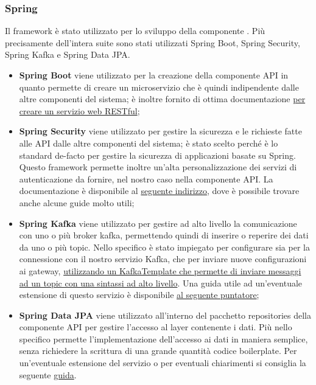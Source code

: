 		\subsubsection{Spring}
			Il framework  è stato utilizzato per lo sviluppo della componente . Più precisamente dell'intera suite sono stati utilizzati Spring Boot, Spring Security, Spring Kafka e Spring Data JPA.
			\newline
			\begin{itemize}
				\item \textbf{Spring Boot} viene utilizzato per la creazione della componente API in quanto permette di creare un microservizio che è quindi indipendente dalle altre componenti del sistema; è inoltre fornito di ottima documentazione \href{https://spring.io/guides/gs/rest-service/}{per creare un servizio web RESTful};
				\item \textbf{Spring Security} viene utilizzato per gestire la sicurezza e le richieste fatte alle API dalle altre componenti del sistema; è stato scelto perché è lo standard de-facto per gestire la sicurezza di applicazioni basate su Spring.
				Questo framework permette inoltre un'alta personalizzazione dei servizi di autenticazione da fornire, nel nostro caso nella componente API. La documentazione è disponibile al \href{https://spring.io/projects/spring-security#learn}{seguente indirizzo}, dove è possibile trovare anche alcune guide molto utili;
				\item \textbf{Spring Kafka} viene utilizzato per gestire ad alto livello la comunicazione con uno o più broker kafka, permettendo quindi di inserire o reperire dei dati da uno o più topic.
				Nello specifico è stato impiegato per configurare sia per la connessione con il nostro servizio Kafka, che per inviare nuove configurazioni ai gateway, \href{https://docs.spring.io/spring-kafka/docs/2.4.6.RELEASE/reference/html/#kafka-template}{utilizzando un KafkaTemplate che permette di inviare messaggi ad un topic con una sintassi ad alto livello}.
				Una guida utile ad un'eventuale estensione di questo servizio è disponibile \href{https://docs.spring.io/spring-kafka/docs/2.4.6.RELEASE/reference/html/#reference}{al seguente puntatore};
				\item \textbf{Spring Data JPA} viene utilizzato all'interno del pacchetto repositories della componente API per gestire l'accesso al layer contenente i dati. Più nello specifico permette l'implementazione dell'accesso ai dati in maniera semplice, senza richiedere la scrittura di una grande quantità codice boilerplate. Per un'eventuale estensione del servizio o per eventuali chiarimenti si consiglia la seguente \href{https://spring.io/guides/gs/accessing-data-jpa/}{guida}.
			\end{itemize}
